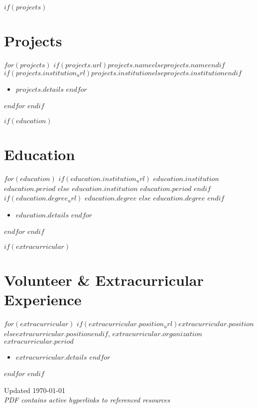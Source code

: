 \documentclass[10.5pt,a4paper]{article}
\newcommand{\daterange}[1]{\textbf{#1}}
\newcommand{\entryHeader}[2]{\noindent\textbf{#1} \hfill \daterange{#2}}
\newcommand{\entryHeaderLinked}[3]{\noindent\textbf{\href{#1}{#2}} \hfill \daterange{#3}}
\newcommand{\entrySubHeader}[1]{\textit{#1}}
\newcommand{\entrySubHeaderLinked}[2]{\textit{\href{#1}{#2}}}
\newenvironment{entryDetails}{%
  \begin{itemize}[leftmargin=*, itemsep=1pt, topsep=1pt, parsep=0pt]
}{%
  \end{itemize}
  \vspace{-0.1cm}
}
\begin{document}
$if(projects)$
\section*{Projects}
$for(projects)$
\noindent\textbf{$if(projects.url)$\href{$projects.url$}{$projects.name$}$else$$projects.name$$endif$} \hfill \textit{$if(projects.institution_url)$\href{$projects.institution_url$}{$projects.institution$}$else$$projects.institution$$endif$}
\begin{entryDetails}
	$for(projects.details)$
	\item $projects.details$
	$endfor$
\end{entryDetails}
$endfor$
$endif$

$if(education)$
\section*{Education}
$for(education)$
$if(education.institution_url)$
\entryHeaderLinked{$education.institution_url$}{$education.institution$}{$education.period$}
$else$
\entryHeader{$education.institution$}{$education.period$}
$endif$
\\
$if(education.degree_url)$
\entrySubHeaderLinked{$education.degree_url$}{$education.degree$}
$else$
\entrySubHeader{$education.degree$}
$endif$
\begin{entryDetails}
	$for(education.details)$
	\item $education.details$
	$endfor$
\end{entryDetails}
$endfor$
$endif$

$if(extracurricular)$
\section*{Volunteer \& Extracurricular Experience}
$for(extracurricular)$
\noindent\textbf{$if(extracurricular.position_url)$\href{$extracurricular.position_url$}{$extracurricular.position$}$else$$extracurricular.position$$endif$}, $extracurricular.organization$ \hfill \daterange{$extracurricular.period$}
\begin{entryDetails}
	$for(extracurricular.details)$
	\item $extracurricular.details$
	$endfor$
\end{entryDetails}
$endfor$
$endif$

\vfill
\begin{center}
	\footnotesize{Updated \today \\ \textit{PDF contains active hyperlinks to referenced resources}}
\end{center}
\end{document}

